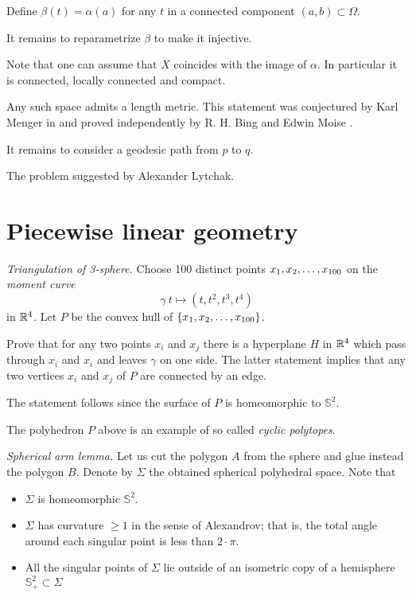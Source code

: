 Define $\beta(t)=\alpha(a)$ for any $t$ in a connected component $(a,b)\subset\Omega$.

It remains to reparametrize $\beta$ to make it injective.

Note that one can assume that $X$ coincides with the image of $\alpha$.
In particular it is connected, locally connected and compact.

Any such space admits a length metric.
This statement was conjectured by Karl Menger in \cite{menger}
and proved independently 
by R. H. Bing  \cite[see][]{bing-length-0, bing-length-1} 
and Edwin Moise \cite[see][]{moise}.

It remains to consider a geodesic path from $p$ to $q$.

The problem suggested by Alexander Lytchak.

\section*{Piecewise linear geometry}


\textit{Triangulation of 3-sphere.}
Choose 100 distinct points $x_1,x_2,\z\dots,x_{100}$
on the {}\emph{moment curve} 
\[\gamma\:t\mapsto (t,t^2,t^3,t^4)\] 
in $\mathbb{R}^4$.
Let $P$ be the convex hull of $\{x_1,x_2,\z\dots,x_{100}\}$.

Prove that for any two points $x_i$ and $x_j$ there is a hyperplane $H$ in $\mathbb{R}^4$ which pass through $x_i$ and $x_i$ and leaves $\gamma$ on one side.
The latter statement implies that any two vertices $x_i$ and $x_j$
of $P$ are connected by an edge.

The statement follows
since the surface of $P$ is homeomorphic to $\mathbb{S}^2$.

The polyhedron $P$ above is an example 
of so called \emph{cyclic polytopes}.

\textit{Spherical arm lemma.}
Let us cut the polygon $A$ from the sphere and glue instead the polygon $B$.
Denote by $\Sigma$ the obtained spherical polyhedral space.
Note that 
\begin{itemize}
\item $\Sigma$ is homeomorphic $\mathbb S^2$.
\item $\Sigma$ has curvature $\ge 1$ in the sense of Alexandrov; that is, the total angle around each singular point is less than $2\cdot \pi$.
\item All the singular points of $\Sigma$ 
lie outside of an isometric copy of a hemisphere $\mathbb{S}^2_+\subset \Sigma$
\end{itemize}


